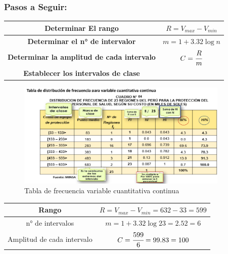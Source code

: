 \documentclass{article}
\begin{document}
            \subsubsection*{Pasos a Seguir:}
                \begin{table}[H]
                    \begin{tabular}{|c|c|}
                        \hline
                        \textbf{Determinar El rango} & $R = V_{max} - V_{min}$ \\ \hline
                        \textbf{Determinar el n° de intervalor} & $m = 1 + 3.32\log{n}$ \\ \hline
                        \textbf{Determinar la amplitud de cada intervalo}  & $C = \cfrac{R}{m}$ \\ \hline
                        \textbf{Establecer los intervalos de clase} &\\\hline
                    \end{tabular}
                \end{table}
                \begin{figure}[H]
                    \centering
                    \includegraphics[width=0.9\textwidth]{img/tabla_2.png}
                    \caption{Tabla de frecuencia variable cuantitativa continua}
                \end{figure}
                \begin{table}[H]
                    \centering
                    \begin{tabular}{|c|c|}
                        \hline
                        Rango & $R = V_{max} - V_{min} = 632 - 33 = 599$ \\ \hline
                        n° de intervalos & $m = 1 + 3.32\log{23}= 2.52=6$ \\ \hline
                        Amplitud de cada intervalo  & $C = \cfrac{599}{6}= 99.83=100$ \\ \hline
                    \end{tabular}
                \end{table}
\end{document}
